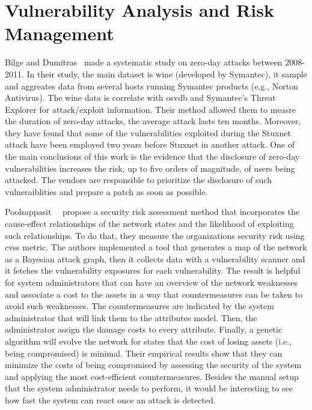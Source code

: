 \section{Vulnerability Analysis and Risk Management}

Bilge and Dumitras~\cite{Bilge:2012} made a systematic study on zero-day attacks between 2008-2011.
In their study, the main dataset is \gls{wine} (developed by Symantec), it sample and aggreates data from several hosts running Symantec products (e.g., Norton Antivirus).
The \gls{wine} data is correlate with \gls{osvdb} and Symantec's Threat Explorer for attack/exploit information.
Their method allowed them to measre the duration of zero-day attacks, the average attack lasts ten months. 
Moreover, they have found that some of the vulnerabilities exploited during the Stuxnet attack have been employed two years before Stuxnet in another attack.
One of the main conclusions of this work is the evidence that the disclosure of zero-day vulnerabilities increases the risk, up to five orders of magnitude, of users being attacked.
The vendors are responsible to prioritize the disclosure of such vulneraiblities and prepare a patch as soon as possible. 


Poolsappasit~\cite{Poolsappasit:2012}~\etal{} propose a security risk assessment method that incorporates the cause-effect relationships of the network states and the likelihood of exploiting such relationships.
To do that, they measure the organizations security risk using \gls{cvss} metric.
The authors implemented a tool that generates a map of the network as a Bayesian attack graph, then it collects data with a vulnerability scanner and it fetches the vulnerability exposures for each vulnerability.
The result is helpful for system administrators that can have an overview of the network weaknesses and associate a cost to the assets in a way that countermeasures can be taken to avoid such weaknesses.
The countermeasures are indicated by the system administrator that will link them to the attributes model.
Then, the administrator assign the damage costs to every attribute.
Finally, a genetic algorithm will evolve the network for states that the cost of losing assets (i.e., being compromised) is minimal. 
Their empirical results show that they can minimize the costs of being compromised by assessing the security of the system and applying the most cost-efficient countermeasures.
Besides the manual setup that the system administrator needs to perform, it would be interesting to see how fast the system can react once an attack is detected.


